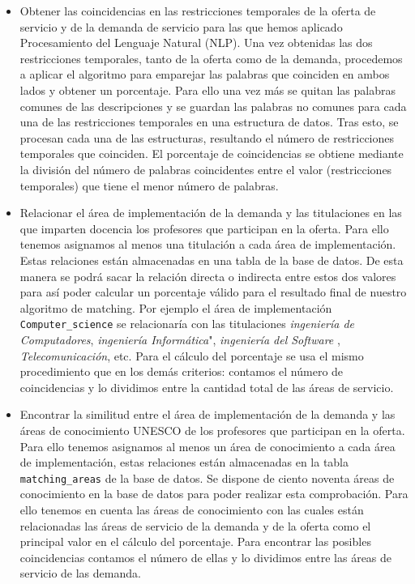 \documentclass[11pt]{book}
\begin{document}
\begin{itemize}
	\item Obtener las coincidencias en las restricciones temporales de la oferta de servicio y de la demanda de servicio para las que hemos aplicado Procesamiento del Lenguaje Natural (NLP). Una vez obtenidas las dos restricciones temporales, tanto de la oferta como de la demanda, procedemos a aplicar el algoritmo para emparejar las palabras que coinciden en ambos lados y obtener un porcentaje. Para ello una vez más se quitan las palabras comunes de las descripciones y se guardan las palabras no comunes para cada una de las restricciones temporales en una estructura de datos. Tras esto, se procesan cada una de las estructuras, resultando el número de restricciones temporales que coinciden. El porcentaje de coincidencias se obtiene mediante la división del número de palabras coincidentes entre el valor (restricciones temporales) que tiene el menor número de palabras.
	
	\item Relacionar el área de implementación de la demanda y las titulaciones en las que imparten docencia los profesores que participan en la oferta. Para ello tenemos asignamos al menos una titulación a cada área de implementación. Estas relaciones están almacenadas en una tabla de la base de datos. De esta manera se podrá sacar la relación directa o indirecta entre estos dos valores para así poder calcular un porcentaje válido para el resultado final de nuestro algoritmo de matching. Por ejemplo el área de implementación \texttt{Computer\_science} se relacionaría con las titulaciones \emph{ingeniería de Computadores}, \emph{ingeniería Informática}", \emph{ingeniería del Software} , \emph{Telecomunicación}, etc. Para el cálculo del porcentaje se usa el mismo procedimiento que en los demás criterios: contamos el número de coincidencias y lo dividimos entre la cantidad total de las áreas de servicio.
	
	\item Encontrar la similitud entre el área de implementación de la demanda y las áreas de conocimiento UNESCO de los profesores que participan en la oferta. Para ello tenemos asignamos al menos un área de conocimiento a cada área de implementación, estas relaciones están almacenadas en la tabla \texttt{matching\_areas} de la base de datos. Se dispone de ciento noventa áreas de conocimiento en la base de datos para poder realizar esta comprobación. Para ello tenemos en cuenta las áreas de conocimiento con las cuales están relacionadas las áreas de servicio de la demanda y de la oferta como el principal valor en el cálculo del porcentaje. Para encontrar las posibles coincidencias contamos el número de ellas y lo dividimos entre las áreas de servicio de las demanda.
\end{itemize}
\end{document}
